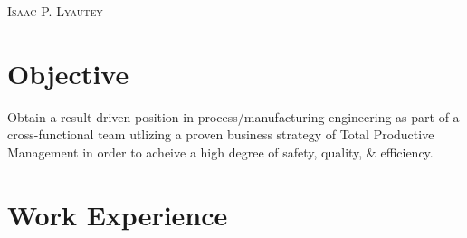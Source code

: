 \documentclass[a4paper, oneside, final, fontsize=9pt, usegeometry]{scrartcl} %
\begin{document}

\begin{center} %


{\fontsize{36}{36}\selectfont\scshape Isaac P. Lyautey}


\section{Objective}
\begin{center}
    Obtain a result driven position in process/manufacturing engineering as part of a cross-functional team utlizing a proven business strategy of Total Productive Management in order to acheive a high degree of safety, quality, \& efficiency.
\end{center}

\vspace{-12pt}


\section{Work Experience}



\end{center}
\end{document}
